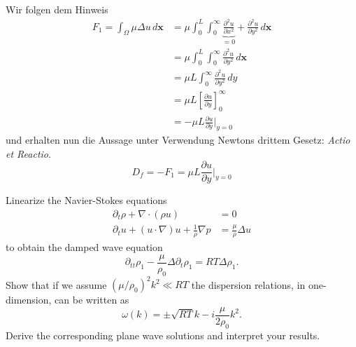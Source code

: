 \documentclass[12pt]{exam}
\newcommand{\del}{\partial}
\begin{document}
\begin{questions}
    \begin{solution} Wir folgen dem Hinweis
        \begin{align*}
            F_1 = \int_{\Omega} \mu \Delta u \, d \mathbf{x} &= \mu \int_0^L \int_0^{\infty} \underbrace{\frac{\del^2 u}{\del x^2}}_{= 0} + \frac{\del^2 u}{\del y^2} \, d \mathbf{x} \\
            &= \mu \int_0^L \int_0^{\infty} \frac{\del^2 u}{\del y^2} \, d \mathbf{x} \\
            &= \mu L \int_0^{\infty} \frac{\del^2 u}{\del y^2} \, dy \\
            &= \mu L \left[ \frac{\del u}{\del y} \right]_{0}^{\infty} \\
            &= -\mu L \frac{\del u}{\del y} \bigg \vert_{y = 0}
        \end{align*}
        und erhalten nun die Aussage unter Verwendung Newtons drittem Gesetz: \textit{Actio et Reactio}.
        \begin{equation*}
            D_f = -F_1 = \mu L \frac{\del u}{\del y} \bigg \vert_{y = 0}
        \end{equation*}
    \end{solution}
    
    
    \question Linearize the Navier-Stokes equations
    \begin{align*}
        \del_t \rho + \nabla \cdot (\rho u) &= 0 \\
        \del_t u + (u \cdot \nabla) u + \frac{1}{\rho} \nabla p &= \frac{\mu}{\rho} \Delta u
    \end{align*}
    to obtain the damped wave equation
    \begin{equation*}
        \del_{tt} \rho_1 - \frac{\mu}{\rho_0} \Delta \del_t \rho_1 = RT \Delta \rho_1.
    \end{equation*}
    Show that if we assume $(\mu / \rho_0)^2 k^2 \ll RT$ the dispersion relations, in one-dimension, can be written as
    \begin{equation*}
        \omega(k) = \pm \sqrt{RT}k - i \frac{\mu}{2 \rho_0} k^2.
    \end{equation*}
    Derive the corresponding plane wave solutions and interpret your results.
    

\end{questions}
\end{document}
